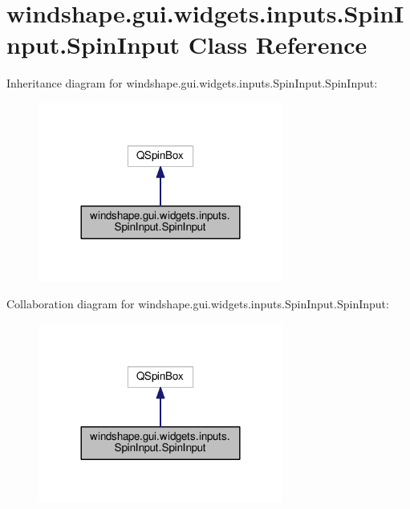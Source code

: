 \hypertarget{classwindshape_1_1gui_1_1widgets_1_1inputs_1_1_spin_input_1_1_spin_input}{}\section{windshape.\+gui.\+widgets.\+inputs.\+Spin\+Input.\+Spin\+Input Class Reference}
\label{classwindshape_1_1gui_1_1widgets_1_1inputs_1_1_spin_input_1_1_spin_input}


Inheritance diagram for windshape.\+gui.\+widgets.\+inputs.\+Spin\+Input.\+Spin\+Input\+:\nopagebreak
\begin{figure}[H]
\begin{center}
\leavevmode
\includegraphics[width=228pt]{classwindshape_1_1gui_1_1widgets_1_1inputs_1_1_spin_input_1_1_spin_input__inherit__graph}
\end{center}
\end{figure}


Collaboration diagram for windshape.\+gui.\+widgets.\+inputs.\+Spin\+Input.\+Spin\+Input\+:\nopagebreak
\begin{figure}[H]
\begin{center}
\leavevmode
\includegraphics[width=228pt]{classwindshape_1_1gui_1_1widgets_1_1inputs_1_1_spin_input_1_1_spin_input__coll__graph}
\end{center}
\end{figure}
